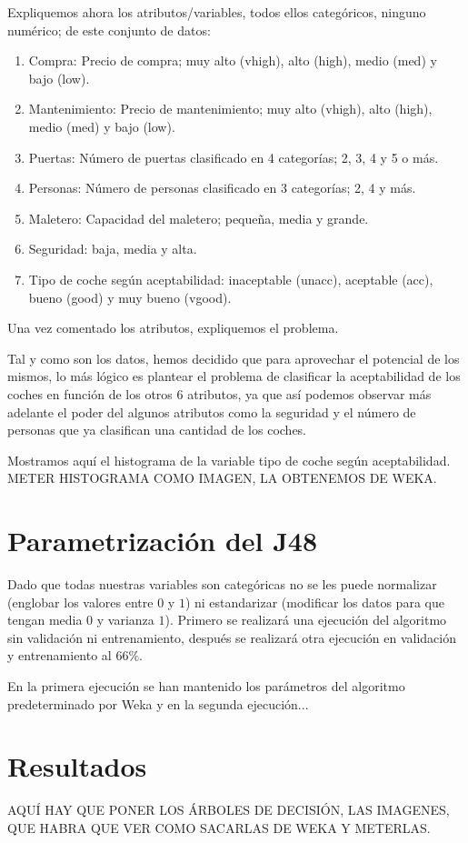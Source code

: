 \documentclass[a4paper, 11pt, twoside, openany, onecolumn, final]{memoir}
\begin{document}
		Expliquemos ahora los atributos/variables, todos ellos categóricos, ninguno numérico; de este conjunto de datos:
	
	\begin{enumerate}
\item Compra: Precio de compra; muy alto (vhigh), alto (high), medio (med) y bajo (low).
\item Mantenimiento: Precio de mantenimiento; muy alto (vhigh), alto (high), medio (med) y bajo (low).
\item Puertas: Número de puertas clasificado en 4 categorías; 2, 3, 4 y 5 o más.
\item Personas: Número de personas clasificado en 3 categorías; 2, 4 y más.
\item Maletero: Capacidad del maletero; pequeña, media y grande.
\item Seguridad: baja, media y alta. 
\item Tipo de coche según aceptabilidad: inaceptable (unacc), aceptable (acc), bueno (good) y muy bueno (vgood). 
\end{enumerate}
		
		Una vez comentado los atributos, expliquemos el problema. 

Tal y como son los datos, hemos decidido que para aprovechar el potencial de los mismos, lo más lógico es plantear el problema de clasificar la aceptabilidad de los coches en función de los otros 6 atributos, ya que así podemos observar más adelante el poder del algunos atributos como la seguridad y el número de personas que ya clasifican una cantidad de los coches.

Mostramos aquí el histograma de la variable tipo de coche según aceptabilidad. 
	METER HISTOGRAMA COMO IMAGEN, LA OBTENEMOS DE WEKA. 
	\section{Parametrización del J48}
		Dado que todas nuestras variables son categóricas no se les puede normalizar (englobar los valores entre $0$ y $1$) ni estandarizar (modificar los datos para que tengan media $0$ y varianza $1$). 
		Primero se realizará una ejecución del algoritmo sin validación ni entrenamiento, después se realizará otra ejecución en validación y entrenamiento al $66\%$.
		
		En la primera ejecución se han mantenido los parámetros del algoritmo predeterminado por Weka y en la segunda ejecución...
	\section{Resultados}
	AQUÍ HAY QUE PONER LOS ÁRBOLES DE DECISIÓN, LAS IMAGENES, QUE HABRA QUE VER COMO SACARLAS DE WEKA Y METERLAS.
\end{document}
